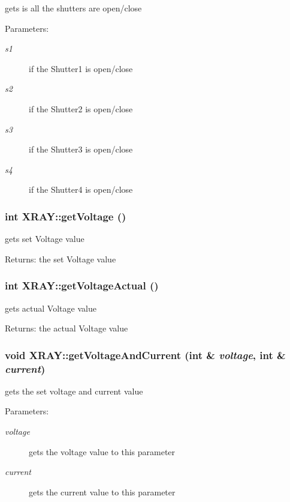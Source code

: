 gets is all the shutters are open/close \begin{Desc}
\item[Parameters:]
\begin{description}
\item[{\em s1}]if the Shutter1 is open/close \item[{\em s2}]if the Shutter2 is open/close \item[{\em s3}]if the Shutter3 is open/close \item[{\em s4}]if the Shutter4 is open/close \end{description}
\end{Desc}
\subsubsection{\setlength{\rightskip}{0pt plus 5cm}int XRAY::get\-Voltage ()}\label{classXRAY_7995dd2ead2aa0d2f98e3c53d6e868c2}


gets set Voltage value \begin{Desc}
\item[Returns:]the set Voltage value \end{Desc}
\subsubsection{\setlength{\rightskip}{0pt plus 5cm}int XRAY::get\-Voltage\-Actual ()}\label{classXRAY_e77b62f4ad193d1e2eb19b800121e39a}


gets actual Voltage value \begin{Desc}
\item[Returns:]the actual Voltage value \end{Desc}
\subsubsection{\setlength{\rightskip}{0pt plus 5cm}void XRAY::get\-Voltage\-And\-Current (int \& {\em voltage}, int \& {\em current})}\label{classXRAY_c511ae49b8b1a165a5f6462bd2a5e587}


gets the set voltage and current value \begin{Desc}
\item[Parameters:]
\begin{description}
\item[{\em voltage}]gets the voltage value to this parameter \item[{\em current}]gets the current value to this parameter \end{description}
\end{Desc}

